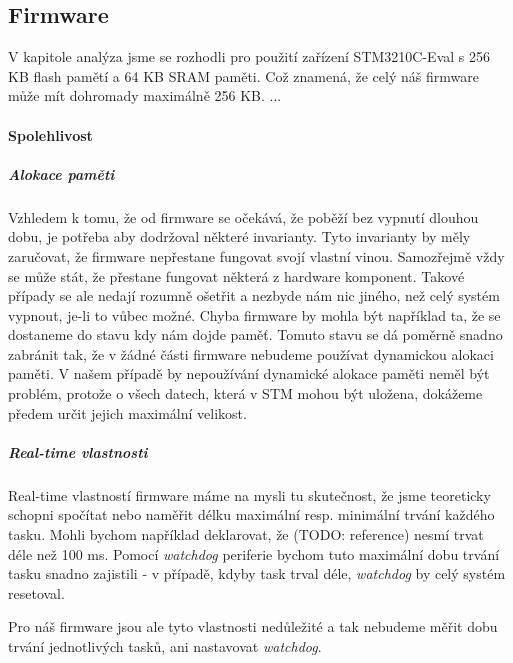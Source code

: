 
\subsection{Firmware}

V kapitole analýza jsme se rozhodli pro použití zařízení STM3210C-Eval s 256 KB flash pamětí
a 64 KB SRAM paměti.
Což znamená, že celý náš firmware může mít dohromady maximálně 256 KB.
...

\paragraph{Spolehlivost}

\subparagraph{Alokace paměti}
Vzhledem k tomu, že od firmware se očekává, že poběží bez vypnutí dlouhou dobu, je potřeba aby
dodržoval některé invarianty.
Tyto invarianty by měly zaručovat, že firmware nepřestane fungovat svojí vlastní vinou.
Samozřejmě vždy se může stát, že přestane fungovat některá z hardware komponent.
Takové případy se ale nedají rozumně ošetřit a nezbyde nám nic jiného, než celý systém vypnout,
je-li to vůbec možné.
Chyba firmware by mohla být například ta, že se dostaneme do stavu kdy nám dojde paměť.
Tomuto stavu se dá poměrně snadno zabránit tak, že v žádné části firmware nebudeme používat
dynamickou alokaci paměti.
V našem případě by nepoužívání dynamické alokace paměti neměl být problém, protože o všech datech,
která v STM mohou být uložena, dokážeme předem určit jejich maximální velikost.

\subparagraph{Real-time vlastnosti}
Real-time vlastností firmware máme na mysli tu skutečnost, že jsme teoreticky schopni spočítat nebo
naměřit délku maximální resp. minimální trvání každého tasku.
Mohli bychom například deklarovat, že  (TODO: reference) nesmí trvat déle než
100 ms.
Pomocí \emph{watchdog} periferie bychom tuto maximální dobu trvání tasku snadno zajistili - v
případě, kdyby task trval déle, \emph{watchdog} by celý systém resetoval.

Pro náš firmware jsou ale tyto vlastnosti nedůležité a tak nebudeme měřit dobu trvání jednotlivých
tasků, ani nastavovat \emph{watchdog}.


